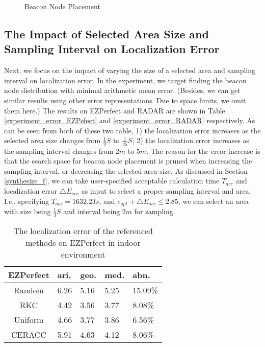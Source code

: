 \documentclass[10pt, conference, letterpaper]{IEEEtran}
\begin{document}
\begin{figure}[!t] \centering
{}
\caption{Beacon Node Placement}
\label{fig2}
\end{figure}


\subsection{The Impact of Selected Area Size and Sampling Interval on Localization Error}
Next, we focus on the impact of varying the size of a selected area and sampling interval on localization error. In the experiment, we target finding the beacon node distribution with minimal arithmetic mean error. (Besides, we can get similar results using other error representations. Due to space limits, we omit them here.) The results on EZPerfect and RADAR are shown in Table \ref{experiment_error_EZPefect} and \ref{experiment_error_RADAR} respectively. As can be seen from both of these two table, 1) the localization error increases as the selected area size changes from $\frac{1}{9}S$ to $\frac{1}{25}S$; 2) the localization error increases as the sampling interval changes from $2m$ to $5m$. The reason for the error increase is that the search space for beacon node placement is pruned when increasing the sampling interval, or decreasing the selected area size. As discussed in Section \ref{synthesize_f}, we can take user-specified acceptable calculation time $T_{acc}$ and localization error $\triangle E_{acc}$ as input to select a proper sampling interval and area. I.e., specifying $T_{acc}=1632.23s$, and $e_{opt}+\triangle E_{acc} \leq 2.85$, we can select an area with size being $\frac{1}{3}S$ and interval being $2m$ for sampling.

\begin{table}[!t]
\renewcommand{\arraystretch}{1.0}
\caption{The localization error of the referenced methods on EZPerfect in indoor environment} \label{experiment_error_referenced_EZPerfect}
\centering
\begin{tabular}{|c|p{0.9cm}|p{0.9cm}|p{0.9cm}|p{0.9cm}|}
  \hline
EZPerfect  & ari. & geo. & med. & abn. \\
  \hline
  Random & 6.26 & 5.16 & 5.25 & 15.09\% \\
  \hline
  RKC & 4.42 & 3.56 & 3.77 & 8.08\% \\
  \hline
  Uniform & 4.66 & 3.77 & 3.86 & 6.56\% \\
  \hline
  CERACC & 5.91 & 4.63 & 4.12 & 8.06\% \\
  \hline
\end{tabular}
\end{table}
\end{document}
